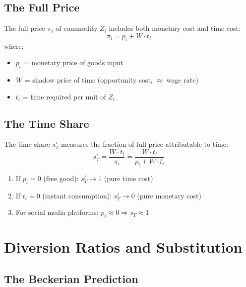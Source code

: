\subsection{The Full Price}

\begin{axiom}
\label{ax:ta-full-price}
The full price $\pi_i$ of commodity $Z_i$ includes both monetary cost and time cost:
\[
\pi_i = p_i + W \cdot t_i
\]
where:
\begin{itemize}[nosep]
\item $p_i$ = monetary price of goods input
\item $W$ = shadow price of time (opportunity cost, $\approx$ wage rate)
\item $t_i$ = time required per unit of $Z_i$
\end{itemize}
\end{axiom}

\subsection{The Time Share}

\begin{definition}
The time share $s_T^i$ measures the fraction of full price attributable to time:
\[
s_T^i = \frac{W \cdot t_i}{\pi_i} = \frac{W \cdot t_i}{p_i + W \cdot t_i}
\]
\end{definition}

\begin{proposition}
\label{prop:pt-limits}
\begin{enumerate}[nosep]
\item If $p_i = 0$ (free good): $s_T^i \to 1$ (pure time cost)
\item If $t_i = 0$ (instant consumption): $s_T^i \to 0$ (pure monetary cost)
\item For social media platforms: $p_i \approx 0 \Rightarrow s_T \approx 1$
\end{enumerate}
\end{proposition}

\section{Diversion Ratios and Substitution}
\label{sec:pt-diversion}

\subsection{The Beckerian Prediction}


